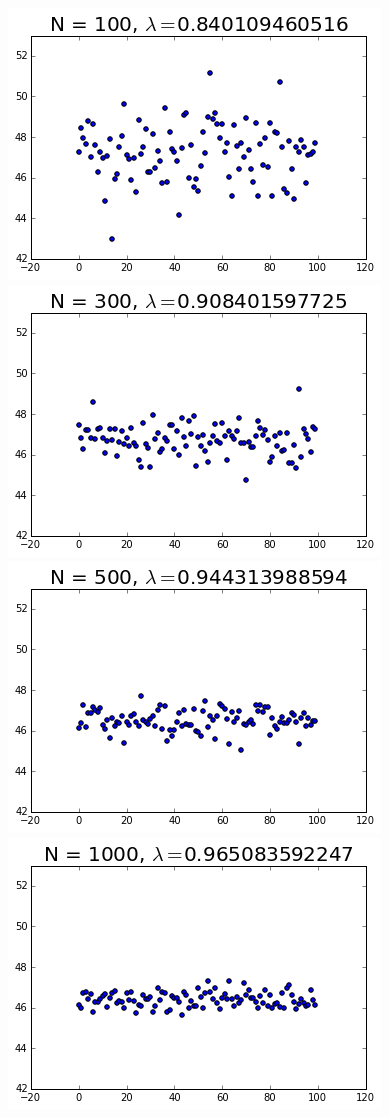 \documentclass{article}
\begin{document}
		{\centering
		\hspace*{-3.75cm}
		\includegraphics[scale=0.55]{100_scatter}
		\includegraphics[scale=0.55]{300_scatter}
		\hspace*{-3.75cm}
		\vspace*{1.25cm}
		\includegraphics[scale=0.55]{500_scatter}
		\includegraphics[scale=0.55]{1000_scatter}	
}
\end{document}
